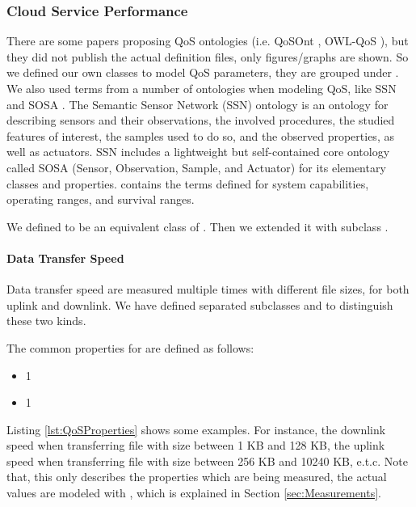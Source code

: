 \subsubsection{Cloud Service Performance}
\label{sec:CloudServicePerformance}
There are some papers proposing QoS ontologies (i.e. QoSOnt \cite{QoSOnt}, OWL-QoS \cite{OWL-QoS}),
but they did not publish the actual definition files, only figures/graphs are shown.
So we defined our own classes to model QoS parameters, they are grouped under .
We also used terms from a number of ontologies when modeling QoS, like SSN  \cite{Compton2012TheSO} and SOSA \cite{Janowicz2018SOSAAL}.
The Semantic Sensor Network (SSN) ontology  is an ontology for describing sensors and their observations, the involved procedures, the studied features of interest, the samples used to do so, and the observed properties, as well as actuators. SSN includes a lightweight but self-contained core ontology called SOSA (Sensor, Observation, Sample, and Actuator)  for its elementary classes and properties.  contains the terms defined for system capabilities, operating ranges, and survival ranges.

We defined  to be an equivalent class of
. Then we extended it with subclass .

\paragraph{Data Transfer Speed}
Data transfer speed are measured multiple times with different file sizes, for both uplink and downlink. We have defined separated subclasses  and  to distinguish these two kinds.

The common properties for  are defined as follows:
\begin{itemize}
  \item[]   1 
  \item[]   1 
\end{itemize}

Listing \ref{lst:QoSProperties} shows some examples. For instance, the downlink speed when transferring file with size between 1 KB and 128 KB,
the uplink speed when transferring file with size between 256 KB and 10240 KB, e.t.c.
Note that, this only describes the properties which are being measured, the actual values are modeled with , which is explained in Section \ref{sec:Measurements}.


